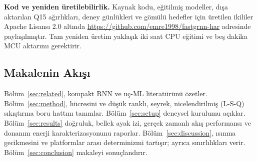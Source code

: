 \noindent\textbf{Kod ve yeniden üretilebilirlik.} Kaynak kodu,
eğitilmiş modeller, dışa aktarılan Q15 ağırlıkları, deney günlükleri
ve gömülü hedefler için üretilen ikililer Apache Lisansı 2.0 altında
\url{https://github.com/emre1998/fastgrnn-har} adresinde
paylaşılmıştır. Tam yeniden üretim yaklaşık iki saat CPU eğitimi ve
beş dakika MCU aktarımı gerektirir.

\subsection{Makalenin Akışı}

Bölüm~\ref{sec:related}, kompakt RNN ve uç-ML literatürünü özetler.
Bölüm~\ref{sec:method}, \fastgrnn{} hücresini ve düşük ranklı,
seyrek, nicelendirilmiş (L-S-Q) sıkıştırma boru hattını tanımlar.
Bölüm~\ref{sec:setup} deneysel kurulumu açıklar. Bölüm~\ref{sec:results}
doğruluk, bellek ayak izi, gerçek zamanlı akış performansı ve donanım
enerji karakterizasyonunu raporlar. Bölüm~\ref{sec:discussion}, ısınma gecikmesini ve
platformlar arası determinizmi tartışır; ayrıca sınırlılıkları
verir. Bölüm~\ref{sec:conclusion} makaleyi sonuçlandırır.
